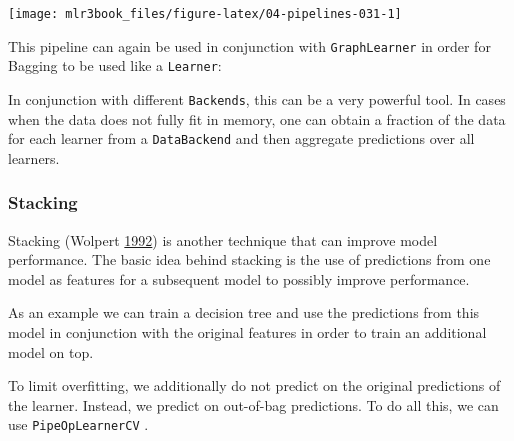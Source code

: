 \documentclass[
  11pt,
  parskip=half,
  DIV=calc,
  BCOR=10mm,
  x11names]{scrbook}
\newenvironment{Shaded}{}{}
\newcommand{\KeywordTok}[1]{\textcolor[rgb]{0.00,0.00,1.00}{#1}}
\newcommand{\NormalTok}[1]{#1}
\newcommand{\OperatorTok}[1]{#1}
\newcommand{\StringTok}[1]{\textcolor[rgb]{0.00,0.50,0.50}{#1}}
\begin{document}
\begin{center}\texttt{[image: mlr3book\_files/figure-latex/04-pipelines-031-1]} \end{center}

This pipeline can again be used in conjunction with \texttt{GraphLearner} in order for Bagging to be used like a \texttt{Learner}:

\begin{Shaded}
\end{Shaded}

In conjunction with different \texttt{Backends}, this can be a very powerful tool.
In cases when the data does not fully fit in memory, one can obtain a fraction of the data for each learner from a \texttt{DataBackend} and then aggregate predictions over all learners.

\hypertarget{pipe-model-ensembles-stacking}{%
\subsubsection{Stacking}\label{pipe-model-ensembles-stacking}}

Stacking (Wolpert \protect\hyperlink{ref-Wolpert1992}{1992}) is another technique that can improve model performance.
The basic idea behind stacking is the use of predictions from one model as features for a subsequent model to possibly improve performance.

As an example we can train a decision tree and use the predictions from this model in conjunction with the original features in order to train an additional model on top.

To limit overfitting, we additionally do not predict on the original predictions of the learner.
Instead, we predict on out-of-bag predictions.
To do all this, we can use \texttt{PipeOpLearnerCV} .
\end{document}
